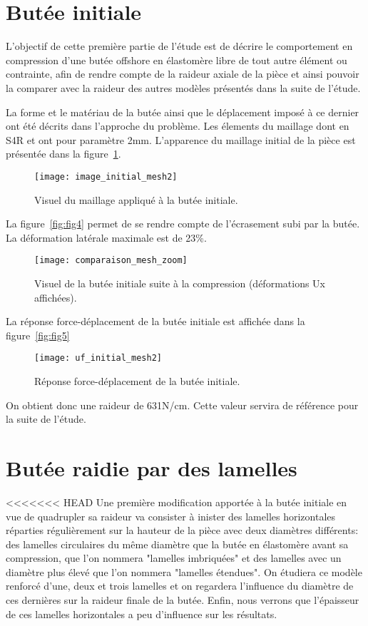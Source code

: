 ﻿\documentclass{article}
\begin{document}
\section{Butée initiale}

L'objectif de cette première partie de l'étude est de décrire le comportement en compression d'une butée offshore en élastomère libre de tout autre élément ou contrainte, afin de rendre compte de la raideur axiale de la pièce et ainsi pouvoir la comparer avec la raideur des autres modèles présentés dans la suite de l'étude.

La forme et le matériau de la butée ainsi que le déplacement imposé à ce dernier ont été décrits dans l'approche du problème. Les élements du maillage dont en S4R et ont pour paramètre 2mm. L'apparence du maillage initial de la pièce est présentée dans la figure~\ref{fig3}.

\begin{figure}[!h]
	\centering
	\texttt{[image: image\_initial\_mesh2]}
	\caption{Visuel du maillage appliqué à la butée initiale.}
	\label{fig3}
\end{figure}

La figure~\ref{fig:fig4} permet de se rendre compte de l'écrasement subi par la butée. La déformation latérale maximale est de 23\%.

\begin{figure}[!h]
	\centering
	\texttt{[image: comparaison\_mesh\_zoom]}
	\caption{Visuel de la butée initiale suite à la compression (déformations Ux affichées).}
	\label{fig4}
\end{figure}

La réponse force-déplacement de la butée initiale est affichée dans la figure~\ref{fig:fig5}

\begin{figure}[!h]
	\centering
	\texttt{[image: uf\_initial\_mesh2]}
	\caption{Réponse force-déplacement de la butée initiale.}
	\label{fig5}
\end{figure}

On obtient donc une raideur de 631N/cm. Cette valeur servira de référence pour la suite de l'étude.


\section{Butée raidie par des lamelles}

<<<<<<< HEAD
Une première modification apportée à la butée initiale en vue de quadrupler sa raideur va consister à inister des lamelles horizontales réparties régulièrement sur la hauteur de la pièce avec deux diamètres différents: des lamelles circulaires du même diamètre que la butée en élastomère avant sa compression, que l'on nommera "lamelles imbriquées" et des lamelles avec un diamètre plus élevé que l'on nommera "lamelles étendues". On étudiera ce modèle renforcé d'une, deux et trois lamelles et on regardera l'influence du diamètre de ces dernières sur la raideur finale de la butée. Enfin, nous verrons que l'épaisseur de ces lamelles horizontales a peu d'influence sur les résultats.
\end{document}
